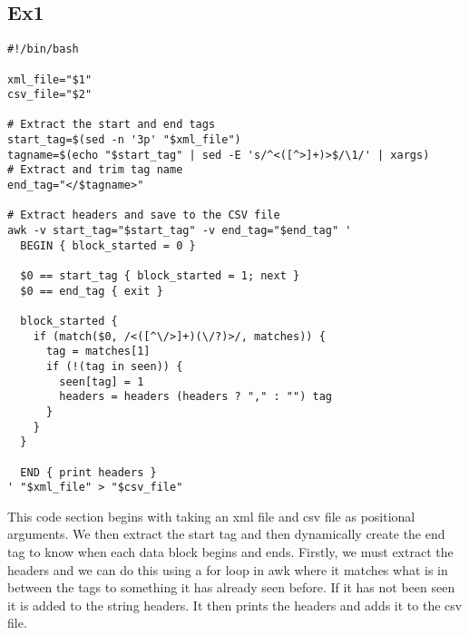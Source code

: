 \documentclass[12pt]{article}
\begin{document}
\subsection{Ex1}
\begin{tcolorbox}[
    enhanced,
    attach boxed title to top left={xshift=6mm,yshift=-3mm},
    colback=lightgreen!20,
    colframe=lightgreen,
    colbacktitle=lightgreen,
    title=Bash Script,
    fonttitle=\bfseries\color{black},
    boxed title style={size=small,colframe=lightgreen,sharp corners},
    sharp corners,
]
\begin{verbatim}
#!/bin/bash

xml_file="$1"
csv_file="$2"

# Extract the start and end tags
start_tag=$(sed -n '3p' "$xml_file")
tagname=$(echo "$start_tag" | sed -E 's/^<([^>]+)>$/\1/' | xargs)  
# Extract and trim tag name
end_tag="</$tagname>"

# Extract headers and save to the CSV file
awk -v start_tag="$start_tag" -v end_tag="$end_tag" '
  BEGIN { block_started = 0 }

  $0 == start_tag { block_started = 1; next }
  $0 == end_tag { exit }

  block_started {
    if (match($0, /<([^\/>]+)(\/?)>/, matches)) {
      tag = matches[1]
      if (!(tag in seen)) {
        seen[tag] = 1
        headers = headers (headers ? "," : "") tag
      }
    }
  }

  END { print headers }
' "$xml_file" > "$csv_file"
\end{verbatim}
\end{tcolorbox}
This code section begins with taking an xml file and csv file as positional arguments. We then extract the start tag and then dynamically create the end tag to know when each data block begins and ends. Firstly, we must extract the headers and we can do this using a for loop in awk where it matches what is in between the tags to something it has already seen before. If it has not been seen it is added to the string headers. It then prints the headers and adds it to the csv file.
\end{document}
